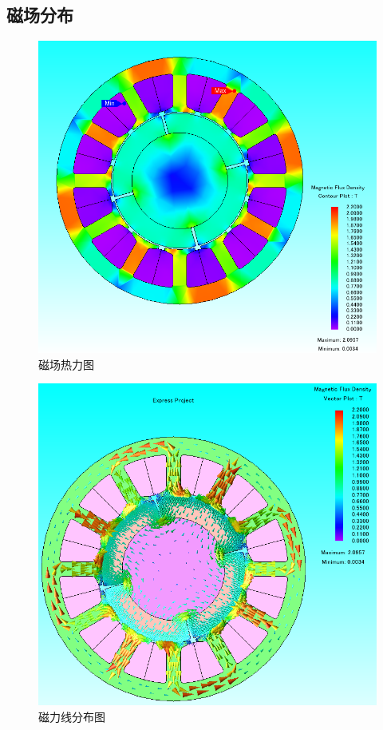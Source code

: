 \documentclass{thuemp}
\begin{document}
\subsection{磁场分布}

\begin{figure}[H]
  \centering
  \includegraphics[width=1\linewidth]{./img/task1/mag-HotImg.png}
  \caption{磁场热力图}
\end{figure}

\begin{figure}[H]
  \centering
  \includegraphics[width=1\linewidth]{./img/task1/mag-LineImg.png}
  \caption{磁力线分布图}
\end{figure}
\end{document}
